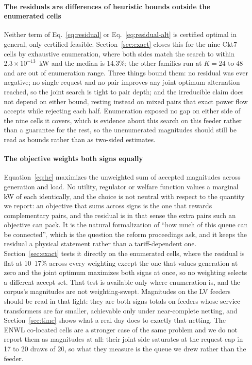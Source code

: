 \documentclass[review,authoryear,12pt]{elsarticle}
\begin{document}
\paragraph{The residuals are differences of heuristic bounds outside the
enumerated cells} Neither term of Eq.~\eqref{eq:residual} or
Eq.~\eqref{eq:residual-alt} is certified optimal in general, only certified
feasible. Section~\ref{sec:exact} closes this for the nine Ckt7 cells by
exhaustive enumeration, where both sides match the search to within
$2.3\times10^{-13}$~kW and the median is 14.3\%; the other families run at
$K=24$ to $48$ and are out of enumeration range. Three things bound them: no
residual was ever negative; no single request and no pair improves any joint
optimum alternation reached, so the joint search is tight to pair depth; and the
irreducible claim does not depend on either bound, resting instead on mixed
pairs that exact power flow accepts while rejecting each half. Enumeration
exposed no gap on either side of the nine cells it covers, which is evidence
about this search on this feeder rather than a guarantee for the rest, so the
unenumerated magnitudes should still be read as bounds rather than as
two-sided estimates.

\paragraph{The objective weights both signs equally} Equation~\eqref{eq:hc}
maximizes the unweighted sum of accepted magnitudes across generation and load.
No utility, regulator or welfare function values a marginal kW of each
identically, and the choice is not neutral with respect to the quantity we
report: an objective that sums across signs is the one that rewards
complementary pairs, and the residual is in that sense the extra pairs such an
objective can pack. It is the natural formalization of ``how much of this queue
can be connected'', which is the question the reform proceedings ask, and it
keeps the residual a physical statement rather than a tariff-dependent one.
Section~\ref{sec:exact} tests it directly on the enumerated cells, where the
residual is flat at 10--17\% across every weighting except the one that values
generation at zero and the joint optimum maximizes both signs at once, so no
weighting selects a different accept-set. That test is available only
where enumeration is, and the corpus's magnitudes are not weighting-swept.
Magnitudes on the LV feeders should be read in that light: they are both-signs
totals on feeders whose service transformers are far smaller, achievable only
under near-complete netting, and Section~\ref{sec:time} shows what a real day
does to exactly that netting. The ENWL co-located cells are a stronger case of
the same problem and we do not report them as magnitudes at all: their joint
side saturates at the request cap in 17 to 20 draws of 20, so what they measure
is the queue we drew rather than the feeder.
\end{document}
